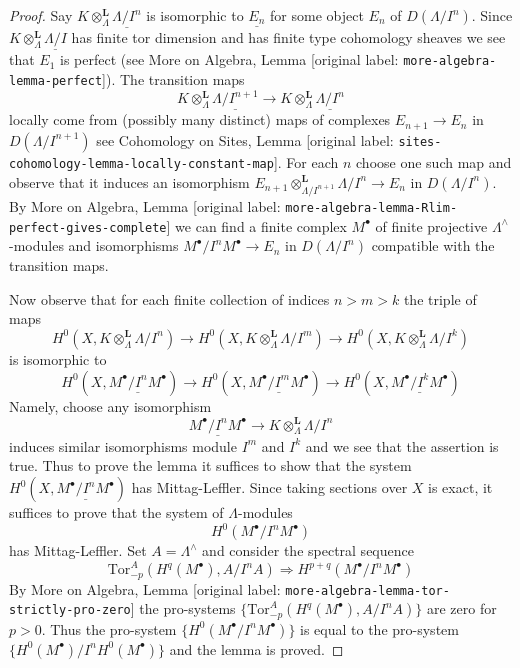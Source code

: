 \documentclass[10pt,a4paper]{article}
\theoremstyle{plain}
\theoremstyle{definition}
\theoremstyle{remark}
\numberwithin{equation}{subsection}
\begin{document}
\begin{proof}
Say $K \otimes_\Lambda^\mathbf{L} \underline{\Lambda/I^n}$ is isomorphic
to $\underline{E_n}$ for some object $E_n$ of $D(\Lambda/I^n)$.
Since $K \otimes_\Lambda^\mathbf{L} \underline{\Lambda/I}$ has
finite tor dimension and has finite type cohomology sheaves
we see that $E_1$ is perfect (see
More on Algebra, Lemma \textnormal{[original label: \nolinkurl{more-algebra-lemma-perfect}]}). The transition maps
$$
K \otimes_\Lambda^\mathbf{L} \underline{\Lambda/I^{n + 1}}
\to
K \otimes_\Lambda^\mathbf{L} \underline{\Lambda/I^n}
$$
locally come from (possibly many distinct) maps of complexes
$E_{n + 1} \to E_n$ in $D(\Lambda/I^{n + 1})$ see
Cohomology on Sites, Lemma \textnormal{[original label: \nolinkurl{sites-cohomology-lemma-locally-constant-map}]}.
For each $n$ choose one such map and observe that it induces
an isomorphism
$E_{n + 1} \otimes_{\Lambda/I^{n + 1}}^\mathbf{L} \Lambda/I^n \to E_n$
in $D(\Lambda/I^n)$. By
More on Algebra, Lemma \textnormal{[original label: \nolinkurl{more-algebra-lemma-Rlim-perfect-gives-complete}]}
we can find a finite complex $M^\bullet$ of finite projective
$\Lambda^\wedge$-modules and isomorphisms $M^\bullet/I^nM^\bullet \to E_n$
in $D(\Lambda/I^n)$ compatible with the transition maps.

\medskip\noindent
Now observe that for each finite collection of indices
$n > m > k$ the triple of maps
$$
H^0(X, K \otimes_\Lambda^\mathbf{L} \Lambda/I^n)
\to
H^0(X, K \otimes_\Lambda^\mathbf{L} \Lambda/I^m)
\to
H^0(X, K \otimes_\Lambda^\mathbf{L} \Lambda/I^k)
$$
is isomorphic to
$$
H^0(X, \underline{M^\bullet/I^nM^\bullet})
\to
H^0(X, \underline{M^\bullet/I^mM^\bullet})
\to
H^0(X, \underline{M^\bullet/I^kM^\bullet})
$$
Namely, choose any isomorphism
$$
\underline{M^\bullet/I^nM^\bullet} \to
K \otimes_\Lambda^\mathbf{L} \Lambda/I^n
$$
induces similar isomorphisms module $I^m$ and $I^k$ and we see that
the assertion is true. Thus to prove the lemma it suffices to show that
the system
$H^0(X, \underline{M^\bullet/I^nM^\bullet})$ has Mittag-Leffler.
Since taking sections over $X$ is exact, it suffices to prove that
the system of $\Lambda$-modules
$$
H^0(M^\bullet/I^nM^\bullet)
$$
has Mittag-Leffler. Set $A = \Lambda^\wedge$ and consider the spectral
sequence
$$
\text{Tor}_{-p}^A(H^q(M^\bullet), A/I^nA) \Rightarrow
H^{p + q}(M^\bullet/I^nM^\bullet)
$$
By More on Algebra, Lemma \textnormal{[original label: \nolinkurl{more-algebra-lemma-tor-strictly-pro-zero}]}
the pro-systems $\{\text{Tor}_{-p}^A(H^q(M^\bullet), A/I^nA)\}$ are zero
for $p > 0$. Thus the pro-system $\{H^0(M^\bullet/I^nM^\bullet)\}$
is equal to the pro-system $\{H^0(M^\bullet)/I^nH^0(M^\bullet)\}$
and the lemma is proved.
\end{proof}
\end{document}
